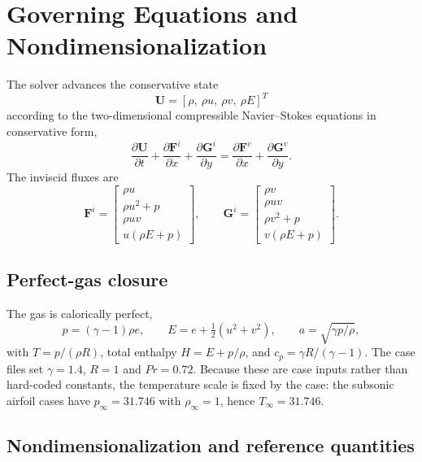 \section{Governing Equations and Nondimensionalization}
\label{sec:equations}

The solver advances the conservative state
\begin{equation}
  \mathbf{U}=[\rho,\ \rho u,\ \rho v,\ \rho E]^T
\end{equation}
according to the two-dimensional compressible Navier--Stokes equations in
conservative form,
\begin{equation}
  \frac{\partial \mathbf{U}}{\partial t}
  +\frac{\partial \mathbf{F}^i}{\partial x}
  +\frac{\partial \mathbf{G}^i}{\partial y}
  =\frac{\partial \mathbf{F}^v}{\partial x}
  +\frac{\partial \mathbf{G}^v}{\partial y}.
  \label{eq:ns}
\end{equation}
The inviscid fluxes are
\begin{equation}
  \mathbf{F}^i=\begin{bmatrix}\rho u\\ \rho u^2+p\\ \rho uv\\ u(\rho E+p)\end{bmatrix},
  \qquad
  \mathbf{G}^i=\begin{bmatrix}\rho v\\ \rho uv\\ \rho v^2+p\\ v(\rho E+p)\end{bmatrix}.
  \label{eq:invflux}
\end{equation}

\subsection{Perfect-gas closure}

The gas is calorically perfect,
\begin{equation}
  p=(\gamma-1)\rho e,\qquad
  E=e+\tfrac12\left(u^2+v^2\right),\qquad
  a=\sqrt{\gamma p/\rho},
\end{equation}
with $T=p/(\rho R)$, total enthalpy $H=E+p/\rho$, and
$c_p=\gamma R/(\gamma-1)$. The case files set $\gamma=1.4$, $R=1$ and
$\mathit{Pr}=0.72$. Because these are case inputs rather than hard-coded
constants, the temperature scale is fixed by the case: the subsonic airfoil
cases have $p_\infty=\num{31.746}$ with $\rho_\infty=1$, hence
$T_\infty=\num{31.746}$.

\subsection{Nondimensionalization and reference quantities}


